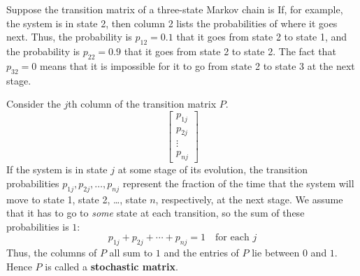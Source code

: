 \documentclass{ximera}
\begin{document}
\begin{example}\label{007243}
Suppose the transition matrix of a three-state Markov chain is
If, for example, the system is in state 2, then column 2 lists the probabilities of where it goes next. Thus, the probability is $p_{12} = 0.1$ that it goes from state 2 to state 1, and the probability is $p_{22} = 0.9$ that it goes from state 2 to state 2. The fact that $p_{32} = 0$ means that it is impossible for it to go from state 2 to state 3 at the next stage.
\end{example}

Consider the $j$th column of the transition matrix $P$.
\begin{equation*}
\begin{bmatrix}
p_{1j} \\
p_{2j} \\
\vdots \\
p_{nj}
\end{bmatrix}
\end{equation*}
If the system is in state $j$ at some stage of its evolution, the transition probabilities $p_{1j}, p_{2j}, \dots, p_{nj}$ represent the fraction of the time that the system will move to state 1, state 2, \dots, state $n$, respectively, at the next stage. We assume that it has to go to \textit{some} state at each transition, so the sum of these probabilities is $1$:
\begin{equation*}
p_{1j} + p_{2j} + \cdots + p_{nj} = 1 \quad \mbox{for each } j
\end{equation*}
Thus, the columns of $P$ all sum to $1$ and the entries of $P$ lie between $0$ and $1$. Hence $P$ is called a \textbf{stochastic matrix}.
\end{document}

